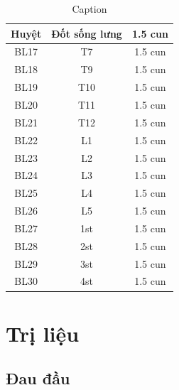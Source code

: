 \begin{table}[]
    \centering
    \begin{tabular}{|c|c|c|}
        \hline
        Huyệt & Đốt sống lưng & 1.5 cun
        \\ \hline
        BL17 & T7 & 1.5 cun
        \\ \hline
        BL18 & T9 & 1.5 cun
        \\ \hline
        BL19 & T10 & 1.5 cun
        \\ \hline
        BL20 & T11 & 1.5 cun
        \\ \hline
        BL21 & T12 & 1.5 cun
        \\ \hline
        BL22 & L1 & 1.5 cun
        \\ \hline
        BL23 & L2 & 1.5 cun
        \\ \hline
        BL24 & L3 & 1.5 cun
        \\ \hline
        BL25 & L4 & 1.5 cun
        \\ \hline
        BL26 & L5 & 1.5 cun
        \\ \hline
        BL27 & 1st & 1.5 cun
        \\ \hline
        BL28 & 2st & 1.5 cun
        \\ \hline
        BL29 & 3st & 1.5 cun
        \\ \hline
        BL30 & 4st & 1.5 cun
        \\ \hline
    \end{tabular}
    \caption{Caption}
    \label{tab:placeholder}
\end{table}

\section{Trị liệu}

\subsection{Đau đầu}

